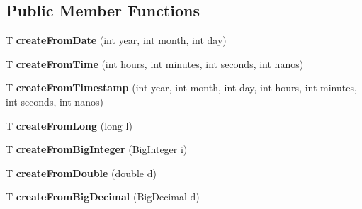 \subsection*{Public Member Functions}
\begin{DoxyCompactItemize}
\item 
\mbox{\label{classcom_1_1mysql_1_1cj_1_1result_1_1_default_value_factory_a7abbef5c2c0a1da994d462bd01bc66ae}} 
T {\bfseries create\+From\+Date} (int year, int month, int day)
\item 
\mbox{\label{classcom_1_1mysql_1_1cj_1_1result_1_1_default_value_factory_af1cd4fa518f703b1eee37b00365f808b}} 
T {\bfseries create\+From\+Time} (int hours, int minutes, int seconds, int nanos)
\item 
\mbox{\label{classcom_1_1mysql_1_1cj_1_1result_1_1_default_value_factory_a826d789263a33a4a914fd4ce07aa44e9}} 
T {\bfseries create\+From\+Timestamp} (int year, int month, int day, int hours, int minutes, int seconds, int nanos)
\item 
\mbox{\label{classcom_1_1mysql_1_1cj_1_1result_1_1_default_value_factory_a051d2bb4762b37e5318c4b12879fee16}} 
T {\bfseries create\+From\+Long} (long l)
\item 
\mbox{\label{classcom_1_1mysql_1_1cj_1_1result_1_1_default_value_factory_ab0c6bdb65a95e8a1459fb64b0fe2a6ae}} 
T {\bfseries create\+From\+Big\+Integer} (Big\+Integer i)
\item 
\mbox{\label{classcom_1_1mysql_1_1cj_1_1result_1_1_default_value_factory_a5a769375b9daa8f06534dec605997715}} 
T {\bfseries create\+From\+Double} (double d)
\item 
\mbox{\label{classcom_1_1mysql_1_1cj_1_1result_1_1_default_value_factory_aaf3123a40d44b5da21e8f0cc7a26142f}} 
T {\bfseries create\+From\+Big\+Decimal} (Big\+Decimal d)
\item 

\end{DoxyCompactItemize}
